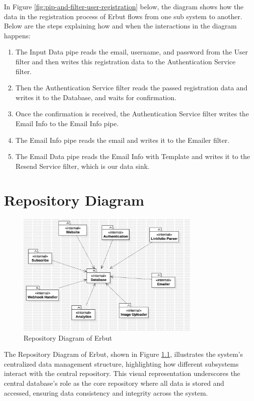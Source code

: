 \documentclass[a4paper]{report}
\begin{document}
In Figure \ref{fig:pip-and-filter-user-registration} below, the diagram shows how the data in the registration process of Erbut flows from one sub system to another. Below are the steps explaining how and when the interactions in the diagram happens:

\begin{enumerate}
    \item The Input Data pipe reads the email, username, and password from the User filter and then writes this registration data to the Authentication Service filter.
    \item Then the Authentication Service filter reads the passed registration data and writes it to the Database, and waits for confirmation.
    \item Once the confirmation is received, the Authentication Service filter writes the Email Info to the Email Info pipe.
    \item The Email Info pipe reads the email and writes it to the Emailer filter.
    \item The Email Data pipe reads the Email Info with Template and writes it to the Resend Service filter, which is our data sink.
\end{enumerate}

\chapter{Repository Diagram}

\begin{figure}[h!]
    \centering
    \includegraphics[width=0.8\textwidth]{images/erbut-repository-diagram.png}
    \caption{Repository Diagram of Erbut}
    \label{fig:repository-diagram}
\end{figure}

The Repository Diagram of Erbut, shown in Figure \ref{fig:repository-diagram}, illustrates the system's centralized data management structure, highlighting how different subsystems interact with the central repository. This visual representation underscores the central database's role as the core repository where all data is stored and accessed, ensuring data consistency and integrity across the system.
\end{document}
